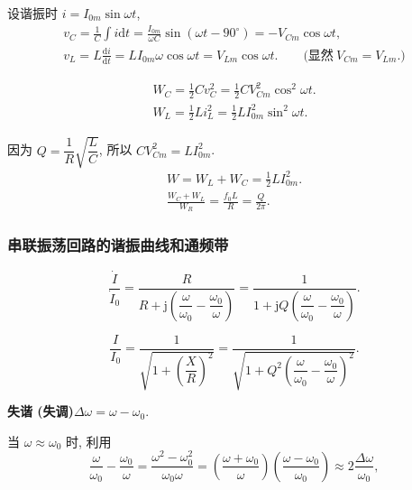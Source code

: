 设谐振时 $i=I_{0m}\sin\omega t$,
\begin{equation*}
    \begin{gathered}
        v_C=\frac{1}{C}\int i\mathrm{d}t=\frac{I_{0m}}{\omega C}\sin(\omega t-90^\circ)=-V_{Cm}\cos\omega t, \\
        v_L=L\frac{\mathrm{d}i}{\mathrm{d}t}=LI_{0m}\omega\cos\omega t=V_{Lm}\cos\omega t.\qquad\textrm{(显然}\ V_{Cm}=V_{Lm}\textrm{.)}
    \end{gathered}
\end{equation*}

\rmg
\begin{gather}
    W_C=\frac{1}{2}Cv_C^2=\frac{1}{2}CV_{Cm}^2\cos^2\omega t. \\
    W_L=\frac{1}{2}Li_L^2=\frac{1}{2}LI_{0m}^2\sin^2\omega t.
\end{gather}

因为 $Q=\dfrac{1}{R}\sqrt{\dfrac{L}{C}}$, 所以 $CV_{Cm}^2=LI_{0m}^2$.
\srmg
\begin{gather}
    W=W_L+W_C=\frac{1}{2}LI_{0m}^2. \\
    \frac{W_C+W_L}{W_R}=\frac{f_0L}{R}=\frac{Q}{2\pi}.
\end{gather}

\subsubsection{串联振荡回路的谐振曲线和通频带} \label{串联振荡回路的谐振曲线和通频带}

\rmg
\begin{equation}
    \frac{\dot{I}}{\dot{I}_0}=\frac{R}{R+\mathrm{j}\left(\dfrac{\omega}{\omega_0}-\dfrac{\omega_0}{\omega}\right)}=\frac{1}{1+\mathrm{j}Q\left(\dfrac{\omega}{\omega_0}-\dfrac{\omega_0}{\omega}\right)}.
\end{equation}

\begin{equation} \label{eq:2.1 I/I_0}
    \frac{I}{I_0}=\frac{1}{\sqrt{1+\left(\dfrac{X}{R}\right)^2}}=\frac{1}{\sqrt{1+Q^2\left(\dfrac{\omega}{\omega_0}-\dfrac{\omega_0}{\omega}\right)^2}}.
\end{equation}

\textbf{失谐 (失调)}\quad $\Delta\omega=\omega-\omega_0$.

当 $\omega\approx\omega_0$ 时, 利用
\begin{equation*}
    \frac{\omega}{\omega_0}-\frac{\omega_0}{\omega}=\frac{\omega^2-\omega_0^2}{\omega_0\omega}=\left(\frac{\omega+\omega_0}{\omega}\right)\left(\frac{\omega-\omega_0}{\omega_0}\right)\approx 2\frac{\Delta\omega}{\omega_0},
\end{equation*}

